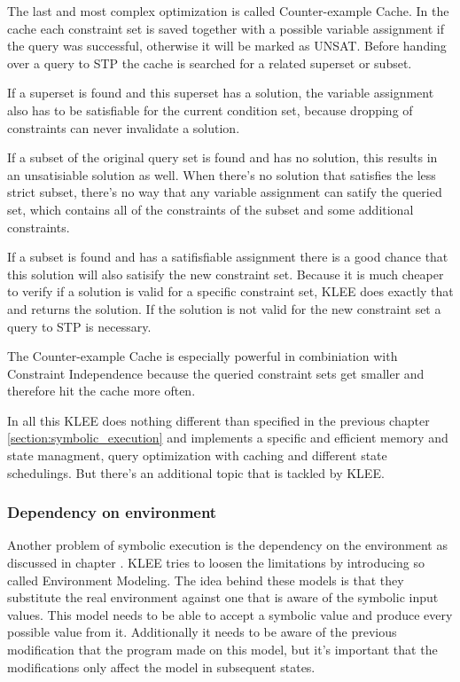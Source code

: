 The last and most complex optimization is called Counter-example Cache. In the cache each constraint set is saved together with a possible variable assignment if the query was successful, otherwise it will be marked as UNSAT. Before handing over a query to STP the cache is searched for a related superset or subset.

If a superset is found and this superset has a solution, the variable assignment also has to be satisfiable for the current condition set, because dropping of constraints can never invalidate a solution.

If a subset of the original query set is found and has no solution, this results in an unsatisiable solution as well. When there's no solution that satisfies the less strict subset, there's no way that any variable assignment can satify the queried set, which contains all of the constraints of the subset and some additional constraints.

If a subset is found and has a satifisfiable assignment there is a good chance that this solution will also satisify the new constraint set. Because it is much cheaper to verify if a solution is valid for a specific constraint set, KLEE does exactly that and returns the solution. If the solution is not valid for the new constraint set a query to STP is necessary.

The Counter-example Cache is especially powerful in combiniation with Constraint Independence because the queried constraint sets get smaller and therefore hit the cache more often.

In all this KLEE does nothing different than specified in the previous chapter \ref{section:symbolic_execution} and implements a specific and efficient memory and state managment, query optimization with caching and different state schedulings. But there's an additional topic that is tackled by KLEE.
\subsubsection{Dependency on environment}
Another problem of symbolic execution is the dependency on the environment as discussed in chapter \label{section:symbolic_restrictions}. KLEE tries to loosen the limitations by introducing so called Environment Modeling. The idea behind these models is that they substitute the real environment against one that is aware of the symbolic input values. 
This model needs to be able to accept a symbolic value and produce every possible value from it. Additionally it needs to be aware of the previous modification that the program made on this model, but it's important that the modifications only affect the model in subsequent states.

